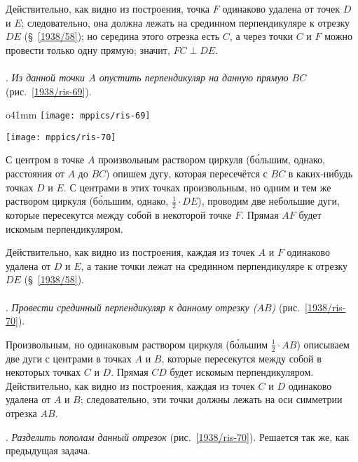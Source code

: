 Действительно, как видно из построения, точка $F$ одинаково удалена от точек $D$ и $E$;
следовательно, она должна лежать на срединном перпендикуляре к отрезку $DE$ (§~\ref{1938/58});
но середина этого отрезка есть $C$, а через точки $C$ и $F$ можно провести только одну прямую;
значит, $FC \perp DE$.

\paragraph{}\label{1938/66}
.
\emph{Из данной точки $A$ опустить перпендикуляр на данную прямую $BC$} (рис.~\ref{1938/ris-69}).

\begin{wrapfigure}{o}{41mm}
\centering
\texttt{[image: mppics/ris-69]}
\caption{}\label{1938/ris-69}
\bigskip
\texttt{[image: mppics/ris-70]}
\caption{}\label{1938/ris-70}
\end{wrapfigure}

С центром в точке $A$ произвольным раствором циркуля (б\'{о}льшим, однако, расстояния от $A$ до $BC$) опишем дугу, которая пересечётся с $BC$ в каких-нибудь точках $D$ и $E$.
С центрами в этих точках произвольным, но одним и тем же раствором циркуля (б\'{о}льшим, однако, $\tfrac12\cdot DE$), проводим две небольшие дуги, которые пересекутся между собой в некоторой точке $F$.
Прямая $AF$ будет искомым перпендикуляром.

Действительно, как видно из построения, каждая из точек $A$ и $F$ одинаково удалена от $D$ и $E$, а такие точки лежат на срединном перпендикуляре к отрезку $DE$ (§~\ref{1938/58}).

\paragraph{}\label{1938/67}
\mbox{.}
\emph{Провести срединный перпендикуляр к данному отрезку \emph{($AB$)}} (рис.~\ref{1938/ris-70}).

Произвольным, но одинаковым раствором циркуля (б\'{о}льшим $\tfrac12\cdot AB$) описываем две дуги с центрами в точках $A$ и $B$, которые пересекутся между собой в некоторых точках $C$ и $D$.
Прямая $CD$ будет искомым перпендикуляром.
Действительно, как видно из построения, каждая из точек $C$ и $D$ одинаково удалена от $A$ и $B$;
следовательно, эти точки должны лежать на оси симметрии отрезка $AB$.

\smallskip
{}.
\emph{Разделить пополам данный отрезок} (рис.~\ref{1938/ris-70}).
Решается так же, как предыдущая задача.

